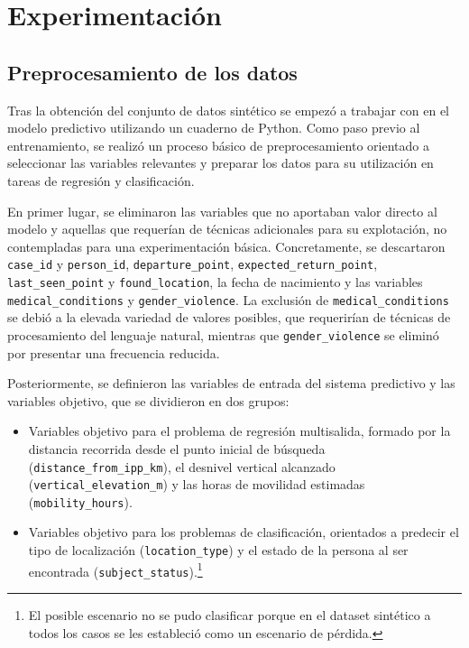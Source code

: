 \section{Experimentación}

\subsection{Preprocesamiento de los datos}
Tras la obtención del conjunto de datos sintético se empezó a trabajar con en el modelo predictivo utilizando un cuaderno de Python. Como paso previo al entrenamiento, se realizó un proceso básico de preprocesamiento orientado a seleccionar las variables relevantes y preparar los datos para su utilización en tareas de regresión y clasificación.

En primer lugar, se eliminaron las variables que no aportaban valor directo al modelo y aquellas que requerían de técnicas adicionales para su explotación, no contempladas para una experimentación básica. Concretamente, se descartaron \texttt{case\_id} y \texttt{person\_id}, \texttt{departure\_point}, \texttt{expected\_return\_point}, \texttt{last\_seen\_point} y \texttt{found\_location}, la fecha de nacimiento y las variables \texttt{medical\_conditions} y \texttt{gender\_violence}. La exclusión de \texttt{medical\_conditions} se debió a la elevada variedad de valores posibles, que requerirían de técnicas de procesamiento del lenguaje natural, mientras que \texttt{gender\_violence} se eliminó por presentar una frecuencia reducida.

Posteriormente, se definieron las variables de entrada del sistema predictivo y las variables objetivo, que se dividieron en dos grupos:
\begin{itemize}
    \item Variables objetivo para el problema de regresión multisalida, formado por la distancia recorrida desde el punto inicial de búsqueda (\texttt{distance\_from\_ipp\_km}), el desnivel vertical alcanzado (\texttt{vertical\_elevation\_m}) y las horas de movilidad estimadas (\texttt{mobility\_hours}). 
    \item Variables objetivo para los problemas de clasificación, orientados a predecir el tipo de localización (\texttt{location\_type})  y el estado de la persona al ser encontrada (\texttt{subject\_status}).\footnote{El posible escenario no se pudo clasificar porque en el dataset sintético a todos los casos se les estableció como un escenario de pérdida.}
\end{itemize} 

